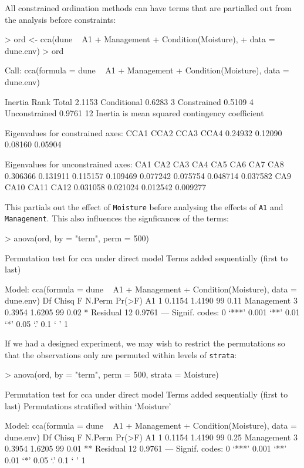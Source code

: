 \documentclass[a4paper,10pt]{amsart}
\begin{document}
All constrained ordination methods can have terms that are partialled
out from the analysis before constraints:
\begin{Schunk}
\begin{Sinput}
> ord <- cca(dune ~ A1 + Management + Condition(Moisture), 
+     data = dune.env)
> ord
\end{Sinput}
\begin{Soutput}
Call:
cca(formula = dune ~ A1 + Management + Condition(Moisture), data = dune.env) 

              Inertia Rank
Total          2.1153     
Conditional    0.6283    3
Constrained    0.5109    4
Unconstrained  0.9761   12
Inertia is mean squared contingency coefficient 

Eigenvalues for constrained axes:
   CCA1    CCA2    CCA3    CCA4 
0.24932 0.12090 0.08160 0.05904 

Eigenvalues for unconstrained axes:
     CA1      CA2      CA3      CA4      CA5      CA6      CA7      CA8 
0.306366 0.131911 0.115157 0.109469 0.077242 0.075754 0.048714 0.037582 
     CA9     CA10     CA11     CA12 
0.031058 0.021024 0.012542 0.009277 
\end{Soutput}
\end{Schunk}
This partials out the effect of \texttt{Moisture} before analysing the
effects of \texttt{A1} and \texttt{Management}.  This also influences
the signficances of the terms:
\begin{Schunk}
\begin{Sinput}
> anova(ord, by = "term", perm = 500)
\end{Sinput}
\begin{Soutput}
Permutation test for cca under direct model
Terms added sequentially (first to last)

Model: cca(formula = dune ~ A1 + Management + Condition(Moisture), data = dune.env)
           Df  Chisq      F N.Perm Pr(>F)  
A1          1 0.1154 1.4190     99   0.11  
Management  3 0.3954 1.6205     99   0.02 *
Residual   12 0.9761                       
---
Signif. codes:  0 ‘***’ 0.001 ‘**’ 0.01 ‘*’ 0.05 ‘.’ 0.1 ‘ ’ 1 
\end{Soutput}
\end{Schunk}
If we had a designed experiment, we may wish to restrict the
permutations so that the observations only are permuted within levels
of \texttt{strata}:
\begin{Schunk}
\begin{Sinput}
> anova(ord, by = "term", perm = 500, strata = Moisture)
\end{Sinput}
\begin{Soutput}
Permutation test for cca under direct model
Terms added sequentially (first to last)
Permutations stratified within `Moisture'

Model: cca(formula = dune ~ A1 + Management + Condition(Moisture), data = dune.env)
           Df  Chisq      F N.Perm Pr(>F)   
A1          1 0.1154 1.4190     99   0.25   
Management  3 0.3954 1.6205     99   0.01 **
Residual   12 0.9761                        
---
Signif. codes:  0 ‘***’ 0.001 ‘**’ 0.01 ‘*’ 0.05 ‘.’ 0.1 ‘ ’ 1 
\end{Soutput}
\end{Schunk}

\end{document}
